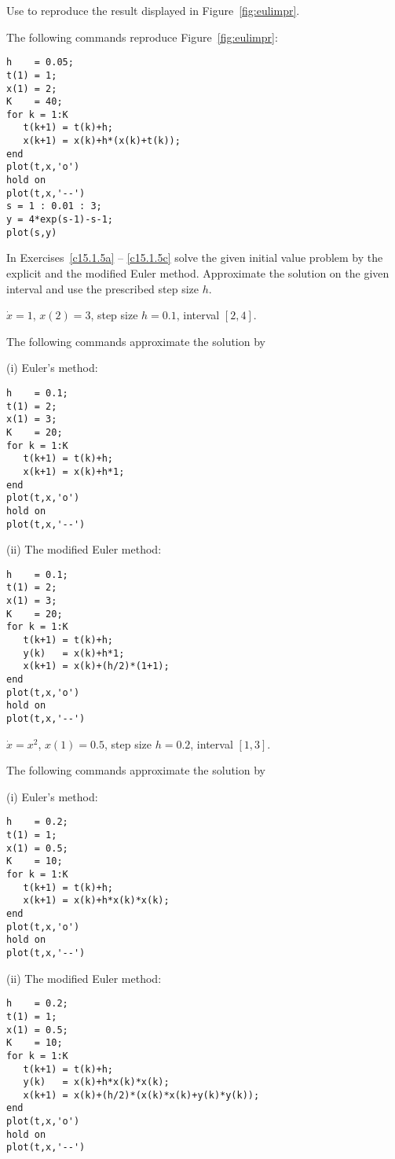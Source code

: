 \documentclass{ximera}
\begin{document}
\CEXER

\begin{exercise} \label{c15.1.6}
Use \Matlab to reproduce the result displayed in Figure~\ref{fig:eulimpr}.

\begin{solution}
The following \Matlab commands reproduce
Figure~\ref{fig:eulimpr}:
\begin{verbatim}
h    = 0.05;
t(1) = 1;
x(1) = 2;
K    = 40;
for k = 1:K
   t(k+1) = t(k)+h;
   x(k+1) = x(k)+h*(x(k)+t(k));
end
plot(t,x,'o')
hold on
plot(t,x,'--')
s = 1 : 0.01 : 3;
y = 4*exp(s-1)-s-1;
plot(s,y)
\end{verbatim}

\end{solution}
\end{exercise}

\noindent In Exercises~\ref{c15.1.5a} -- \ref{c15.1.5c} solve
the given initial value problem by the explicit and the
modified Euler method.  Approximate the solution on the given interval
and use the prescribed step size $h$.
\begin{exercise} \label{c15.1.5a}
$\dot x = 1$, $x(2)=3$, step size $h=0.1$, interval $[2,4]$.

\begin{solution}
The following \Matlab commands approximate the
solution by

(i) Euler's method:
\begin{verbatim}
h    = 0.1;
t(1) = 2;
x(1) = 3;
K    = 20;
for k = 1:K
   t(k+1) = t(k)+h;
   x(k+1) = x(k)+h*1;
end
plot(t,x,'o')
hold on
plot(t,x,'--')
\end{verbatim}

(ii) The modified Euler method:
\begin{verbatim}
h    = 0.1;
t(1) = 2;
x(1) = 3;
K    = 20;
for k = 1:K
   t(k+1) = t(k)+h;
   y(k)   = x(k)+h*1;
   x(k+1) = x(k)+(h/2)*(1+1);
end
plot(t,x,'o')
hold on
plot(t,x,'--')
\end{verbatim}


\end{solution}
\end{exercise}
\begin{exercise} \label{c15.1.5b}
$\dot x = x^2$, $x(1)=0.5$, step size $h=0.2$, interval $[1,3]$.

\begin{solution}
The following \Matlab commands approximate the solution by

(i) Euler's method:
\begin{verbatim}
h    = 0.2;
t(1) = 1;
x(1) = 0.5;
K    = 10;
for k = 1:K
   t(k+1) = t(k)+h;
   x(k+1) = x(k)+h*x(k)*x(k);
end
plot(t,x,'o')
hold on
plot(t,x,'--')
\end{verbatim}

(ii)  The modified Euler method:
\begin{verbatim}
h    = 0.2;
t(1) = 1;
x(1) = 0.5;
K    = 10;
for k = 1:K
   t(k+1) = t(k)+h;
   y(k)   = x(k)+h*x(k)*x(k);
   x(k+1) = x(k)+(h/2)*(x(k)*x(k)+y(k)*y(k));
end
plot(t,x,'o')
hold on
plot(t,x,'--')
\end{verbatim}

\end{solution}
\end{exercise}
\end{document}
